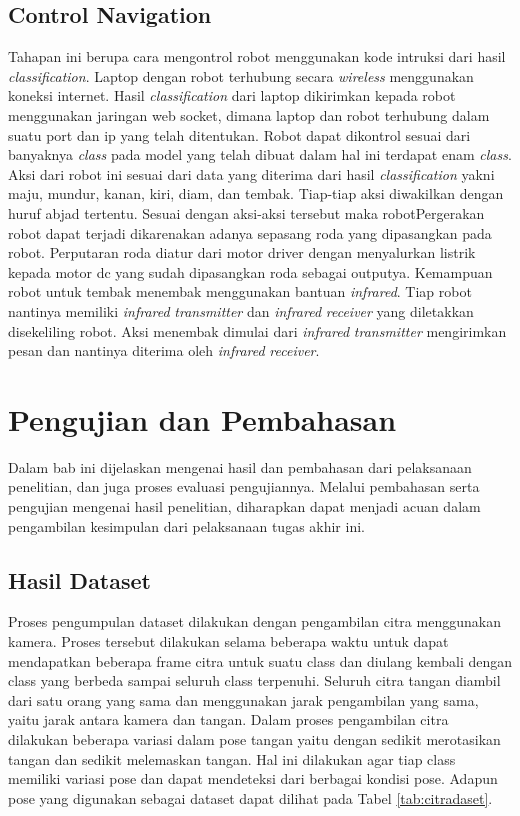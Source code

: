 \documentclass[conference]{IEEEtran}
\begin{document}
\subsection{Control Navigation}
Tahapan ini berupa cara mengontrol robot menggunakan kode intruksi dari hasil \emph{classification}. Laptop dengan robot terhubung secara \emph{wireless} menggunakan koneksi internet. Hasil \emph{classification} dari laptop dikirimkan kepada robot menggunakan jaringan web socket, dimana laptop dan robot terhubung dalam suatu port dan ip yang telah ditentukan. Robot dapat dikontrol sesuai dari banyaknya \emph{class} pada model yang telah dibuat dalam hal ini terdapat enam \emph{class}. Aksi dari robot ini sesuai dari data yang diterima dari hasil \emph{classification} yakni maju, mundur, kanan, kiri, diam, dan tembak. Tiap-tiap aksi diwakilkan dengan huruf abjad tertentu. Sesuai dengan aksi-aksi tersebut maka robotPergerakan robot dapat terjadi dikarenakan adanya sepasang roda yang dipasangkan pada robot. Perputaran roda diatur dari motor driver dengan menyalurkan listrik kepada motor dc yang sudah dipasangkan roda sebagai outputya. Kemampuan robot untuk tembak menembak menggunakan bantuan \emph{infrared}. Tiap robot nantinya memiliki \emph{infrared} \emph{transmitter} dan \emph{infrared} \emph{receiver} yang diletakkan disekeliling robot. Aksi menembak dimulai dari \emph{infrared} \emph{transmitter} mengirimkan pesan dan nantinya diterima oleh \emph{infrared} \emph{receiver}.

\section{Pengujian dan Pembahasan}
Dalam bab ini dijelaskan mengenai hasil dan pembahasan dari pelaksanaan penelitian, dan juga proses evaluasi pengujiannya. Melalui pembahasan serta pengujian mengenai hasil penelitian, diharapkan dapat menjadi acuan dalam pengambilan kesimpulan dari pelaksanaan tugas akhir ini.

\subsection{Hasil Dataset}
Proses pengumpulan dataset dilakukan dengan pengambilan citra menggunakan kamera. Proses tersebut dilakukan selama beberapa waktu untuk dapat mendapatkan beberapa frame citra untuk suatu class dan diulang kembali dengan class yang berbeda sampai seluruh class terpenuhi. Seluruh citra tangan diambil dari satu orang yang sama dan menggunakan jarak pengambilan yang sama, yaitu jarak antara kamera dan tangan. Dalam proses pengambilan citra dilakukan beberapa variasi dalam pose tangan yaitu dengan sedikit merotasikan tangan dan sedikit melemaskan tangan. Hal ini dilakukan agar tiap class memiliki variasi pose dan dapat mendeteksi dari berbagai kondisi pose. Adapun pose yang digunakan sebagai dataset dapat dilihat pada Tabel \ref{tab:citradaset}.
\end{document}
